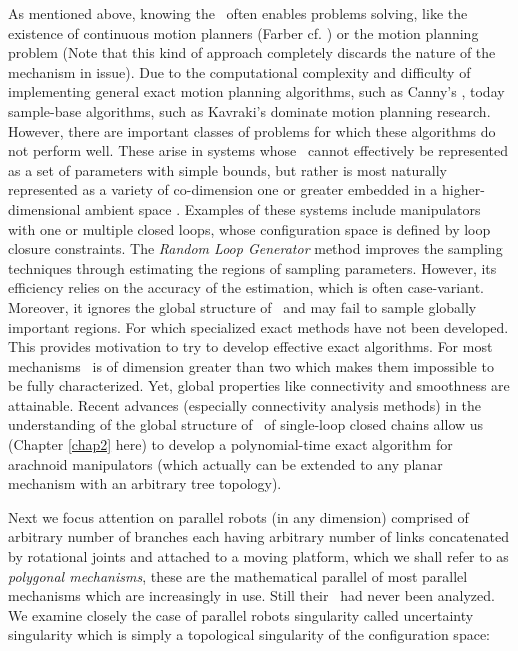 As mentioned above, knowing the \cspace \ often enables problems
solving, like the existence of continuous motion planners (Farber
cf. \cite{F}) or the motion planning problem (Note that this kind
of approach completely discards the nature of the mechanism in
issue). Due to the computational complexity and difficulty of
implementing general exact motion planning algorithms, such as
Canny's \cite{Can88}, today sample-base algorithms, such as
Kavraki's \cite{KSLO96} dominate motion planning research.
However, there are important classes of problems for which these
algorithms do not perform well. These arise in systems whose
\cspace \ cannot effectively be represented as a set of parameters
with simple bounds, but rather is most naturally represented as a
variety of co-dimension one or greater embedded in a
higher-dimensional ambient space \cite{YLK01}. Examples of these
systems include manipulators with one or multiple closed loops,
whose configuration space is defined by loop closure constraints.
The \emph{Random Loop Generator} method \cite{Cortes02,CS03}
improves the sampling techniques through estimating the regions of
sampling parameters. However, its efficiency relies on the
accuracy of the estimation, which is often case-variant. Moreover,
it ignores the global structure of \cspace \, and may fail to
sample globally important regions. For which specialized exact
methods have not been developed. This provides motivation to try
to develop effective exact algorithms. For most mechanisms \cspace
\ is of dimension greater than two which makes them impossible to
be fully characterized. Yet, global properties like connectivity
and smoothness are attainable. Recent advances (especially
connectivity analysis methods) in the understanding of the global
structure of \cspace \ of single-loop closed chains
\cite{MT2,SSB05} allow us (Chapter \ref{chap2} here) to develop a
polynomial-time exact algorithm for arachnoid manipulators (which
actually can be extended to any planar mechanism with an arbitrary
tree topology).

Next we focus attention on parallel robots (in any dimension)
comprised of arbitrary number of branches each having arbitrary
number of links concatenated by rotational joints and attached to
a moving platform, which we shall refer to as \emph{polygonal
mechanisms}, these are the mathematical parallel of most parallel
mechanisms which are increasingly in use. Still their \cspace \
had never been analyzed. We examine closely the case of parallel
robots singularity called uncertainty singularity which is simply
a topological singularity of the configuration space:

